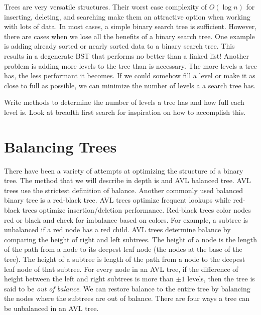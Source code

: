 \label{lab:btrees}

Trees are very versatile structures.  
Their worst case complexity of $O(\log n)$ for inserting, deleting, and searching make them an attractive option when working with lots of data.
In most cases, a simple binary search tree is sufficient.
However, there are cases when we lose all the benefits of a binary search tree.
One example is adding already sorted or nearly sorted data to a binary search tree.
This results in a degenerate BST that performs no better than a linked list!
Another problem is adding more levels to the tree than is necessary.
The more levels a tree has, the less performant it becomes.  If we could somehow fill a level or make it as close to full as possible, we can minimize the number of levels a a search tree has.

\begin{problem}
Write methods to determine the number of levels a tree has and how full each level is.  Look at breadth first search for inspiration on how to accomplish this.
\end{problem}

\section*{Balancing Trees}
There have been a variety of attempts at optimizing the structure of a binary tree.
The method that we will describe in depth is and AVL balanced tree.
AVL trees use the strictest definition of balance.
Another commonly used balanced binary tree is a red-black tree.  AVL trees optimize frequent lookups while red-black trees optimize insertion/deletion performance.
Red-black trees color nodes red or black and check for imbalance based on colors.  For example, a subtree is unbalanced if a red node has a red child.
AVL trees determine balance by comparing the height of right and  left subtrees.
The height of a node is the length of the path from a node to its deepest leaf node (the nodes at the base of the tree).
The height of a subtree is length of the path from a node to the deepest leaf node of that subtree.
For every node in an AVL tree, if the difference of height between the left and right subtrees is more than $\pm 1$ levels, then the tree is said to be \emph{out of balance}.  We can restore balance to the entire tree by balancing the nodes where the subtrees are out of balance.
There are four ways a tree can be unbalanced in an AVL tree.

